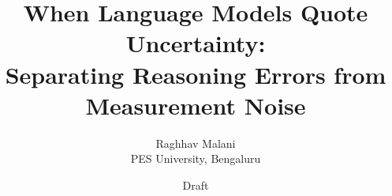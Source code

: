\documentclass[11pt]{article}
\title{When Language Models Quote Uncertainty:\\Separating Reasoning Errors from Measurement Noise}
\author{Raghhav Malani\\PES University, Bengaluru}
\date{Draft}
\begin{document}
\maketitle

\begin{abstract}

\end{abstract}













\appendix

\end{document}
